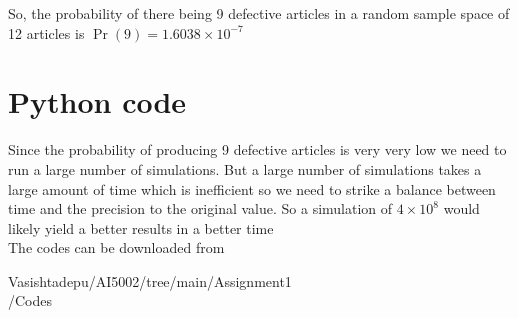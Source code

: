 \documentclass[journal,12pt,twocolumn]{IEEEtran}
\begin{document}
So, the probability of there being 9 defective articles in a random sample space of 12 articles is $\Pr(9)=1.6038\times 10^{-7}$ 


\section*{Python code}
Since the probability of producing 9 defective articles is very very low we need to run a large number of simulations. But a large number of simulations takes a large amount of time which is inefficient so we need to strike a balance between time and the precision to the original value. So a simulation of $4\times10^8$ would likely yield a better results in a better time\\
The codes can be downloaded from

\begin{tcolorbox}{
Vasishtadepu/AI5002/tree/main/Assignment1\\/Codes
}
\end{tcolorbox}
\end{document}
